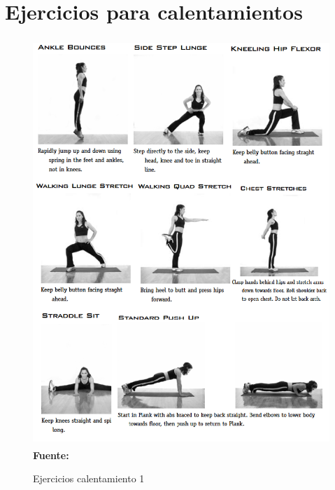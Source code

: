 \section{Ejercicios para calentamientos} \label{anx:warmup}
\begin{figure}[H]
	\caption{Ejercicios calentamiento 1}
	\label{fig:anxWarmup1}
	\centering
	\includegraphics[width=430px,height=580px]{graphics/warmup1.PNG} \\
	\textbf{Fuente:} \cite{arbour2006strength}
\end{figure}

